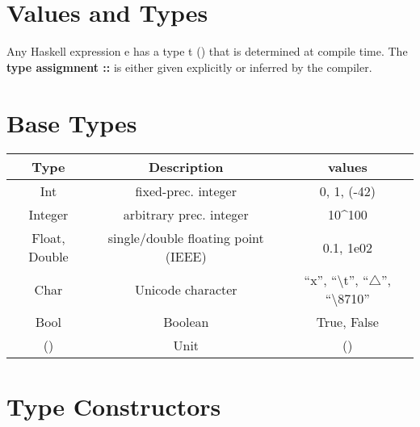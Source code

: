 

\section{Values and Types} %
\label{cha:values_and_types}

Any Haskell expression e has a type t () that is determined at compile time.
The \textbf{type assigmnent ::} is either given explicitly or inferred by the compiler.

\section{Base Types}
\begin{center}
\begin{tabular}{|c|c|c|}\hline
\rowcolor{grau}     
Type					& Description                                   	& values                                \\\hline
Int						  & fixed-prec. integer                            & 0, 1, (-42)                           \\\hline
Integer         	   & arbitrary prec. integer                        & 10\textasciicircum 100                \\\hline
Float, Double      & single/double floating point (IEEE)    & 0.1, 1e02                             \\\hline
Char            		& Unicode character                             & ``x'', ``\textbackslash t'',  ``$\triangle$'', ``\textbackslash 8710''\\\hline
Bool            		& Boolean                                       	  & True, False                           \\\hline
()              		   & Unit                                          			& ()                                    \\\hline
\end{tabular}
\end{center}


\section{Type Constructors}

